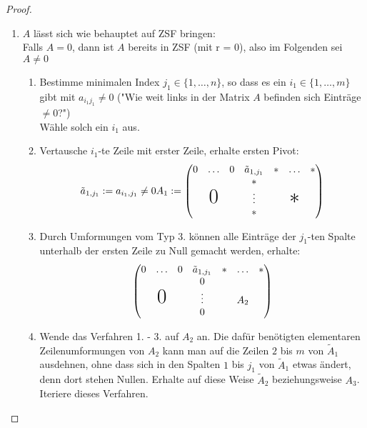 \documentclass[a4paper]{scrartcl}
\theoremstyle{definition}
\theoremstyle{plain}
\theoremstyle{plain}
\theoremstyle{remark}
\theoremstyle{remark}
\theoremstyle{remark}
\theoremstyle{remark}
\theoremstyle{remark}
\begin{document}
\begin{proof}
\begin{enumerate}
\item $A$ lässt sich wie behauptet auf ZSF bringen: \\
         Falls $A = 0$, dann ist $A$ bereits in ZSF (mit r = 0), also im Folgenden sei $A \neq 0$ \\
\begin{enumerate}
\item Bestimme minimalen Index $j_1 \in \{1, \ldots, n\}$, so dass es ein $i_1 \in \{1, \ldots, m\}$ gibt mit $a_{i_1 j_1} \neq 0$ ("Wie weit links in der Matrix $A$ befinden sich Einträge $\neq 0$?") \\
                Wähle solch ein $i_1$ aus.
\item Vertausche $i_1$-te Zeile mit erster Zeile, erhalte ersten Pivot:
\begin{equation}
\tilde a_{1, j_1} := a_{i_1, j_1} \neq 0 \\
A_1 :=
\begin{pmatrix}
0 & \ldots & 0 & \tilde a_{1, j_1} & \ast & \ldots & \ast \\
  &        &   &       \ast        &  & & \\
& \text{\huge0} & & \vdots & & \text{\huge$\ast$} & \\
& & & \ast & & & \\
\end{pmatrix}
\end{equation}
\item Durch Umformungen vom Typ 3. können alle Einträge der $j_1$-ten Spalte unterhalb der ersten Zeile zu Null gemacht werden, erhalte:
\begin{equation}
\begin{pmatrix}
0 & \ldots & 0 & \tilde a_{1, j_1} & \ast & \ldots & \ast \\
  &        &   &       0        &  & & \\
& \text{\huge0} & & \vdots & & A_2 & \\
& & & 0 & & & \\
\end{pmatrix}
\end{equation}
\item Wende das Verfahren 1. - 3. auf $A_2$ an. Die dafür benötigten elementaren Zeilenumformungen von $A_2$ kann man
auf die Zeilen $2$ bis $m$ von $\tilde A_1$ ausdehnen, ohne dass sich in den Spalten $1$ bis $j_1$ von $\tilde A_1$ etwas ändert, denn
dort stehen Nullen. Erhalte auf diese Weise $\tilde A_2$ beziehungsweise $A_3$. Iteriere dieses Verfahren.

\end{enumerate}
\end{enumerate}
\end{proof}
\end{document}
